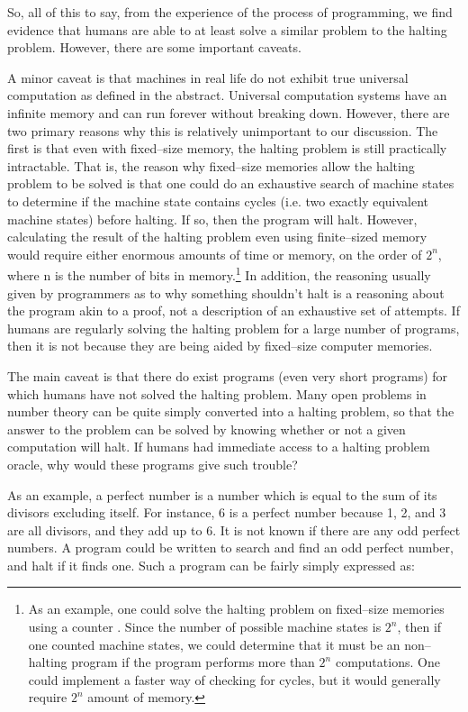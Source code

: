 So, all of this to say, from the experience of the process of programming, we find evidence that humans are able to at least solve a similar problem to the halting problem.  However, there are some important caveats.

A minor caveat is that machines in real life do not exhibit true universal computation as defined in the abstract.  Universal computation systems have an infinite memory and can run forever without breaking down.  However, there are two primary reasons why this is relatively unimportant to our discussion.  The first is that even with fixed--size memory, the halting problem is still practically intractable.  That is, the reason why fixed--size memories allow the halting problem to be solved is that one could do an exhaustive search of machine states to determine if the machine state contains cycles (i.e. two exactly equivalent machine states) before halting.  If so, then the program will halt.  However, calculating the result of the halting problem even using finite--sized memory would require either enormous amounts of time or memory, on the order of $2^n$, where n is the number of bits in memory.\footnote{As an example, one could solve the halting problem on fixed--size memories using a counter \citep{gurari1989}.  Since the number of possible machine states is $2^n$, then if one counted machine states, we could determine that it must be an non--halting program if the program performs more than $2^n$ computations.  One could implement a faster way of checking for cycles, but it would generally require $2^n$ amount of memory.}  In addition, the reasoning usually given by programmers as to why something shouldn't halt is a reasoning about the program akin to a proof, not a description of an exhaustive set of attempts.  If humans are regularly solving the halting problem for a large number of programs, then it is not because they are being aided by fixed--size computer memories.

The main caveat is that there do exist programs (even very short programs) for which humans have not solved the halting problem.  Many open problems in number theory can be quite simply converted into a halting problem, so that the answer to the problem can be solved by knowing whether or not a given computation will halt.  If humans had immediate access to a halting problem oracle, why would these programs give such trouble?

As an example, a perfect number is a number which is equal to the sum of its divisors excluding itself.  For instance, 6 is a perfect number because 1, 2, and 3 are all divisors, and they add up to 6.  It is not known if there are any odd perfect numbers.  A program could be written to search and find an odd perfect number, and halt if it finds one.  Such a program can be fairly simply expressed as:

